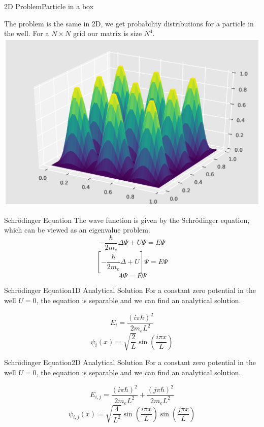 \documentclass[mathserif]{beamer}
\begin{document}
\begin{frame}{2D Problem}{Particle in a box}

The problem is the same in 2D, we get probability distributions for a particle in the well. For a $N \times N$ grid our matrix is size $N^4$. \\
\center \includegraphics[scale=0.4]{2dp.eps}
  
\end{frame}

\begin{frame}{Schrödinger Equation}
The wave function is given by the Schrödinger equation, which can be viewed as an eigenvalue problem. \\

$$ - \frac{\hbar}{2 m_e} \Delta \Psi + U \Psi = E \Psi$$
$$ \left[- \frac{\hbar}{2 m_e} \Delta + U \right] \Psi = E \Psi$$
$$ A \Psi = E \Psi$$
  
\end{frame}

\begin{frame}{Schrödinger Equation}{1D Analytical Solution}
For a constant zero potential in the well $U = 0$, the equation is separable and we can find an analytical solution.

$$E_i = \frac{(i \pi \hbar)^2}{2 m_e L^2}$$
$$ \psi_i (x) = \sqrt{\frac{2}{L}} \sin \left( \frac{i \pi x }{L} \right)$$
  
\end{frame}

\begin{frame}{Schrödinger Equation}{2D Analytical Solution}
For a constant zero potential in the well $U = 0$, the equation is separable and we can find an analytical solution.

$$E_{i,j} = \frac{(i \pi \hbar)^2}{2 m_e L^2}+\frac{(j \pi \hbar)^2}{2 m_e L^2}$$
$$ \psi_{i,j} (x) = \sqrt{\frac{4}{L^2}} \sin \left( \frac{i \pi x }{L} \right) \sin \left( \frac{j \pi x }{L} \right)$$
  
\end{frame}
\end{document}
